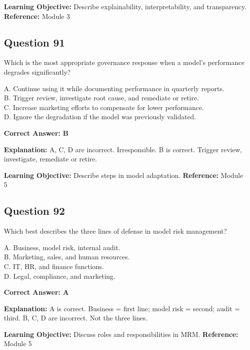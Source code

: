 \documentclass[11pt]{article}
\begin{document}
	\textbf{Learning Objective:} Describe explainability, interpretability,
	and transparency.
	\textbf{Reference:} Module 3
	
	\subsection*{Question 91}
	Which is the most appropriate governance response when a model's
	performance degrades significantly?
	
	A. Continue using it while documenting performance in quarterly reports.\\
	B. Trigger review, investigate root cause, and remediate or retire.\\
	C. Increase marketing efforts to compensate for lower performance.\\
	D. Ignore the degradation if the model was previously validated.
	
	\vspace{0.4em}
	\textbf{Correct Answer: B}
	
	\textbf{Explanation:}
	A, C, D are incorrect. Irresponsible.
	B is correct. Trigger review, investigate, remediate or retire.
	
	\textbf{Learning Objective:} Describe steps in model adaptation.
	\textbf{Reference:} Module 5
	
	\subsection*{Question 92}
	Which best describes the three lines of defense in model risk
	management?
	
	A. Business, model risk, internal audit.\\
	B. Marketing, sales, and human resources.\\
	C. IT, HR, and finance functions.\\
	D. Legal, compliance, and marketing.
	
	\vspace{0.4em}
	\textbf{Correct Answer: A}
	
	\textbf{Explanation:}
	A is correct. Business = first line; model risk = second; audit = third.
	B, C, D are incorrect. Not the three lines.
	
	\textbf{Learning Objective:} Discuss roles and responsibilities in MRM.
	\textbf{Reference:} Module 5
	
\end{document}

